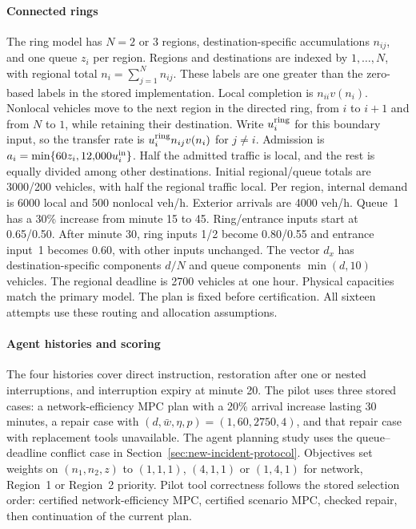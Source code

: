 \documentclass[preprint,12pt]{elsarticle}
\theoremstyle{definition}
\theoremstyle{plain}
\theoremstyle{definition}
\theoremstyle{plain}
\begin{document}
\paragraph{Connected rings}
\label{app:network-transfer}
The ring model has $N=2$ or $3$ regions, destination-specific
accumulations $n_{ij}$, and one queue $z_i$ per region. Regions and
destinations are indexed by $1,\ldots,N$, with regional total
$n_i=\sum_{j=1}^N n_{ij}$. These labels are one greater than the
zero-based labels in the stored implementation. Local completion is
$n_{ii}v(n_i)$. Nonlocal vehicles move to the next region in the directed
ring, from $i$ to $i+1$ and from $N$ to $1$, while retaining their
destination. Write $u_i^{\rm ring}$ for this boundary input, so the
transfer rate is $u_i^{\rm ring}n_{ij}v(n_i)$ for $j\ne i$.
Admission is $a_i=\min\{60z_i,12{,}000u_i^{\rm in}\}$.
Half the admitted traffic is local, and the rest is equally divided
among other destinations. Initial regional/queue totals are 3000/200
vehicles, with half the regional traffic local. Per region, internal
demand is 6000 local and 500 nonlocal veh/h. Exterior arrivals are
4000 veh/h. Queue~1 has a 30\% increase from minute 15 to 45.
Ring/entrance inputs start at 0.65/0.50. After minute 30, ring inputs
1/2 become 0.80/0.55 and entrance input~1 becomes 0.60, with other
inputs unchanged. The vector $d_x$ has destination-specific components
$d/N$ and queue components $\min(d,10)$ vehicles. The regional deadline
is 2700 vehicles at one hour. Physical capacities match the primary
model. The plan is fixed before certification. All sixteen attempts use
these routing and allocation assumptions.

\paragraph{Agent histories and scoring}
\label{sec:supp-execution}
The four histories cover direct instruction, restoration after one or
nested interruptions, and interruption expiry at minute 20. The pilot
uses three stored cases: a network-efficiency MPC plan with a 20\%
arrival increase lasting 30 minutes, a repair case with
$(d,\bar w,\eta,p)=(1,60,2750,4)$, and that repair case with replacement
tools unavailable. The agent planning study uses the queue--deadline
conflict case in Section~\ref{sec:new-incident-protocol}. Objectives set
weights on $(n_1,n_2,z)$ to $(1,1,1)$, $(4,1,1)$ or $(1,4,1)$ for network,
Region~1 or Region~2 priority. Pilot tool correctness follows the stored
selection order: certified network-efficiency MPC, certified scenario
MPC, checked repair, then continuation of the current plan.
\end{document}
